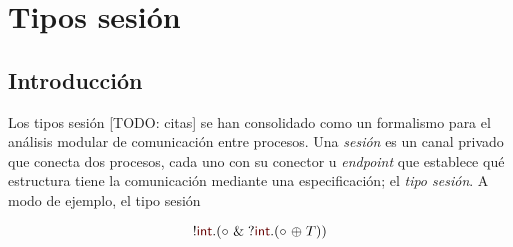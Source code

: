 \chapter{Tipos sesión}
\section{Introducción}

Los tipos sesión [TODO: citas] se han consolidado como un formalismo para el
análisis modular de comunicación entre procesos. Una \emph{sesión} es un canal
privado que conecta dos procesos, cada uno con su conector u \emph{endpoint} que
establece qué estructura tiene la comunicación mediante una especificación; el
\emph{tipo sesión}. A modo de ejemplo, el tipo sesión

\begin{equation}
    \cout \tint \parens {
        \tbranch [] \tend {
            \cin \tint \parens {
                \tchoice [] \tend \T
            }
        }
    }
\end{equation}